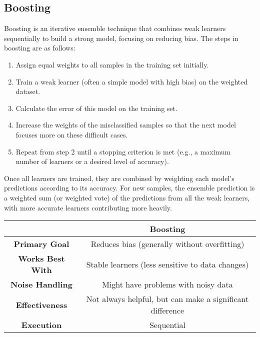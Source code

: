 \subsection{Boosting}
Boosting is an iterative ensemble technique that combines weak learners sequentially to build a strong model, focusing on reducing bias. 
The steps in boosting are as follows:
\begin{enumerate} 
    \item Assign equal weights to all samples in the training set initially. 
    \item Train a weak learner (often a simple model with high bias) on the weighted dataset. 
    \item Calculate the error of this model on the training set. 
    \item Increase the weights of the misclassified samples so that the next model focuses more on these difficult cases. 
    \item Repeat from step 2 until a stopping criterion is met (e.g., a maximum number of learners or a desired level of accuracy). 
\end{enumerate}
Once all learners are trained, they are combined by weighting each model's predictions according to its accuracy. 
For new samples, the ensemble prediction is a weighted sum (or weighted vote) of the predictions from all the weak learners, with more accurate learners contributing more heavily.
\begin{table}[H]
    \centering
    \begin{tabular}{|c|c|}
    \hline
    & \textbf{Boosting} \\ \hline
    \textbf{Primary Goal} & Reduces bias (generally without overfitting) \\ \hline
    \textbf{Works Best With} & Stable learners (less sensitive to data changes) \\ \hline
    \textbf{Noise Handling} & Might have problems with noisy data \\ \hline
    \textbf{Effectiveness} & Not always helpful, but can make a significant difference \\ \hline
    \textbf{Execution} & Sequential \\ \hline
    \end{tabular}
\end{table}